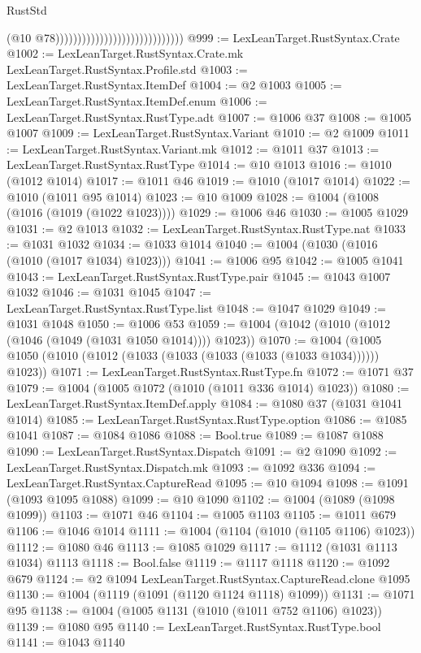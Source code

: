 \begin{lexlean}{RustStd}
\begin{coremodule}
                                                            (@10 @78)))))))))))))))))))))))))))))
@999 := LexLeanTarget.RustSyntax.Crate
@1002 := LexLeanTarget.RustSyntax.Crate.mk LexLeanTarget.RustSyntax.Profile.std
@1003 := LexLeanTarget.RustSyntax.ItemDef
@1004 := @2 @1003
@1005 := LexLeanTarget.RustSyntax.ItemDef.enum
@1006 := LexLeanTarget.RustSyntax.RustType.adt
@1007 := @1006 @37
@1008 := @1005 @1007
@1009 := LexLeanTarget.RustSyntax.Variant
@1010 := @2 @1009
@1011 := LexLeanTarget.RustSyntax.Variant.mk
@1012 := @1011 @37
@1013 := LexLeanTarget.RustSyntax.RustType
@1014 := @10 @1013
@1016 := @1010 (@1012 @1014)
@1017 := @1011 @46
@1019 := @1010 (@1017 @1014)
@1022 := @1010 (@1011 @95 @1014)
@1023 := @10 @1009
@1028 := @1004 (@1008 (@1016 (@1019 (@1022 @1023))))
@1029 := @1006 @46
@1030 := @1005 @1029
@1031 := @2 @1013
@1032 := LexLeanTarget.RustSyntax.RustType.nat
@1033 := @1031 @1032
@1034 := @1033 @1014
@1040 := @1004 (@1030 (@1016 (@1010 (@1017 @1034) @1023)))
@1041 := @1006 @95
@1042 := @1005 @1041
@1043 := LexLeanTarget.RustSyntax.RustType.pair
@1045 := @1043 @1007 @1032
@1046 := @1031 @1045
@1047 := LexLeanTarget.RustSyntax.RustType.list
@1048 := @1047 @1029
@1049 := @1031 @1048
@1050 := @1006 @53
@1059 := @1004 (@1042 (@1010 (@1012 (@1046 (@1049 (@1031 @1050 @1014)))) @1023))
@1070 := @1004 (@1005 @1050 (@1010 (@1012 (@1033 (@1033 (@1033 (@1033 (@1033 @1034)))))) @1023))
@1071 := LexLeanTarget.RustSyntax.RustType.fn
@1072 := @1071 @37
@1079 := @1004 (@1005 @1072 (@1010 (@1011 @336 @1014) @1023))
@1080 := LexLeanTarget.RustSyntax.ItemDef.apply
@1084 := @1080 @37 (@1031 @1041 @1014)
@1085 := LexLeanTarget.RustSyntax.RustType.option
@1086 := @1085 @1041
@1087 := @1084 @1086
@1088 := Bool.true
@1089 := @1087 @1088
@1090 := LexLeanTarget.RustSyntax.Dispatch
@1091 := @2 @1090
@1092 := LexLeanTarget.RustSyntax.Dispatch.mk
@1093 := @1092 @336
@1094 := LexLeanTarget.RustSyntax.CaptureRead
@1095 := @10 @1094
@1098 := @1091 (@1093 @1095 @1088)
@1099 := @10 @1090
@1102 := @1004 (@1089 (@1098 @1099))
@1103 := @1071 @46
@1104 := @1005 @1103
@1105 := @1011 @679
@1106 := @1046 @1014
@1111 := @1004 (@1104 (@1010 (@1105 @1106) @1023))
@1112 := @1080 @46
@1113 := @1085 @1029
@1117 := @1112 (@1031 @1113 @1034) @1113
@1118 := Bool.false
@1119 := @1117 @1118
@1120 := @1092 @679
@1124 := @2 @1094 LexLeanTarget.RustSyntax.CaptureRead.clone @1095
@1130 := @1004 (@1119 (@1091 (@1120 @1124 @1118) @1099))
@1131 := @1071 @95
@1138 := @1004 (@1005 @1131 (@1010 (@1011 @752 @1106) @1023))
@1139 := @1080 @95
@1140 := LexLeanTarget.RustSyntax.RustType.bool
@1141 := @1043 @1140

\end{coremodule}
\end{lexlean}
